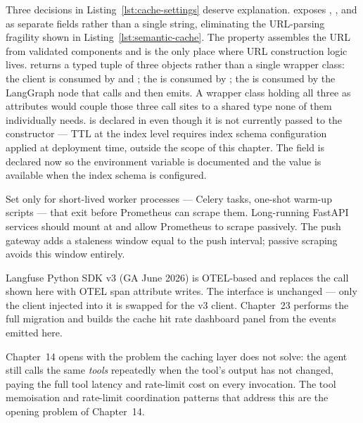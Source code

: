 Three decisions in Listing~\ref{lst:cache-settings} deserve explanation.
 exposes , , and
 as separate fields rather than a single
 string, eliminating the URL-parsing fragility shown in
Listing~\ref{lst:semantic-cache}. The  property
assembles the URL from validated components and is the only place where
URL construction logic lives.  returns a typed
tuple of three objects rather than a single wrapper class: the
 client is consumed by  and
; the  is consumed
by ; the  is consumed
by the LangGraph node that calls  and then emits.
A wrapper class holding all three as attributes would couple those
three call sites to a shared type none of them individually needs.
 is declared in  even
though it is not currently passed to the 
constructor --- TTL at the  index level requires index
schema configuration applied at deployment time, outside the scope of
this chapter. The field is declared now so the environment variable is
documented and the value is available when the index schema is configured.

\begin{tipbox}
Set  only for short-lived worker
processes --- Celery tasks, one-shot warm-up scripts --- that exit before
Prometheus can scrape them. Long-running FastAPI services should mount
 at  and allow
Prometheus to scrape passively. The push gateway adds a staleness window
equal to the push interval; passive scraping avoids this window entirely.
\end{tipbox}

\begin{notebox}
Langfuse Python SDK v3 (GA June 2026) is OTEL-based and replaces the
 call shown here with OTEL span attribute
writes. The  interface is unchanged --- only
the  client injected into it is swapped for the v3
client. Chapter~23 performs the full migration and builds the cache hit
rate dashboard panel from the  events emitted here.
\end{notebox}

Chapter~14 opens with the problem the caching layer does not solve:
the agent still calls the same \emph{tools} repeatedly when the tool's
output has not changed, paying the full tool latency and rate-limit cost
on every invocation. The tool memoisation and rate-limit coordination
patterns that address this are the opening problem of Chapter~14.
